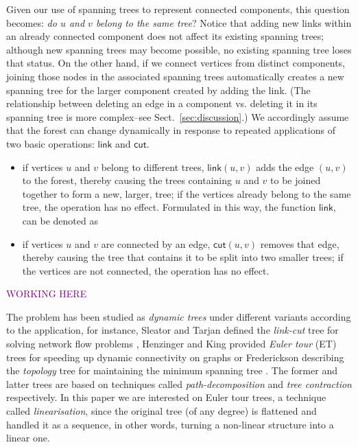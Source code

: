 \documentclass{elsarticle}
\newcommand{\madd}[1]{\textcolor{Purple}{#1}}
\newcommand{\MATHSF}[1]{\ensuremath{\mathsf{#1}}\xspace}
\newcommand{\link}{\MATHSF{link}}
\newcommand{\cut}{\MATHSF{cut}}
\begin{document}
Given our use of spanning trees to represent connected components, this question becomes: \emph{do $u$ and $v$ belong to the same tree}? Notice that adding new links within an already connected component does not affect its existing spanning trees; although new spanning trees may become possible, no existing spanning tree loses that status. On the other hand, if we connect vertices from distinct components, joining those nodes in the associated spanning trees automatically creates a new spanning tree for the larger component created by adding the link. (The relationship between deleting an edge in a component vs. deleting it in its spanning tree is more complex--see Sect.~\ref{sec:discussion}.)  We accordingly assume that the forest can change dynamically in response to repeated applications of two basic operations: \link and \cut. 
\begin{itemize}
\item
  if vertices $u$ and $v$ belong to different trees, $\link(u,v)$ adds the edge $(u,v)$ to the forest, thereby causing the trees containing $u$ and $v$ to be joined together to form a new, larger, tree; if the vertices already belong to the same tree, the operation has no effect. Formulated in this way, the function \link, can be denoted as
\item
  if vertices $u$ and $v$ are connected by an edge, $\cut(u,v)$ removes that edge, thereby causing the tree that contains it to be split into two smaller trees; if the vertices are not connected, the operation has no effect. 
\end{itemize}

\madd{WORKING HERE}

The problem has been studied as \textit{dynamic trees} under different variants according to the application, for instance, Sleator and Tarjan defined the \textit{link-cut} tree for solving network flow problems \cite{DS-DynTs}, Henzinger and King provided \textit{Euler tour} (ET) trees for speeding up dynamic connectivity on graphs \cite{Rand-DynGs-Algos} or Frederickson describing the \textit{topology} tree for maintaining the minimum spanning tree \cite{DSs-Online-Upd-MSTs}. The former and latter trees are based on techniques called \textit{path-decomposition} and \textit{tree contraction} respectively. In this paper we are interested on Euler tour trees, a technique called \textit{linearisation}, since the original tree (of any degree) is flattened and handled it as a sequence, in other words, turning a non-linear structure into a linear one.
\end{document}
